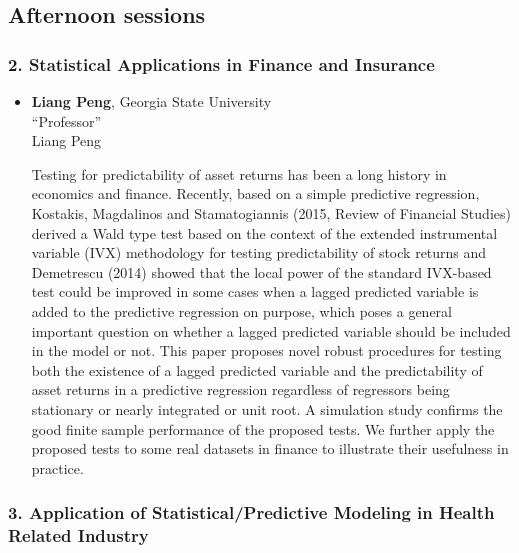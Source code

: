 \subsection*{Afternoon sessions}

\subsubsection*{2. Statistical Applications in Finance and Insurance}

\begin{itemize}
\item \textbf{Liang Peng}, Georgia State University \\
``Professor'' \\
Liang Peng


Testing for predictability of asset returns has been a long history in economics and finance. Recently, based on a simple predictive regression, Kostakis, Magdalinos and Stamatogiannis (2015,  Review of Financial Studies) derived a Wald type test based on the context of the extended instrumental variable (IVX) methodology for testing predictability of stock returns and Demetrescu (2014) showed that the local power of the standard IVX-based test could be improved in some cases when a lagged predicted variable is added to the predictive regression on purpose, which poses a general important question on whether a lagged predicted variable should be included in the model or not. This paper proposes novel robust   procedures for testing both the existence of a lagged predicted variable and the predictability of asset returns in a predictive regression regardless of regressors being stationary or nearly integrated or unit root. A simulation study confirms the good finite sample performance of the proposed tests. We further apply the proposed tests to some real datasets in finance to illustrate their usefulness in practice.

\end{itemize}

\subsubsection*{3. Application of Statistical/Predictive Modeling in Health Related Industry}

